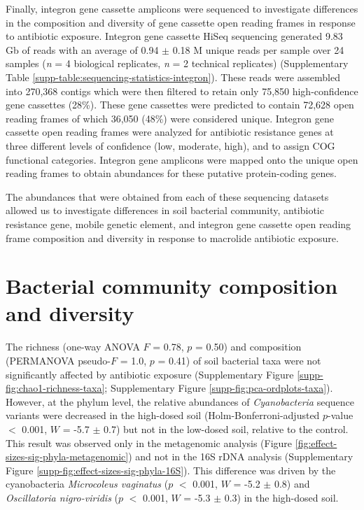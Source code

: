 Finally, integron gene cassette amplicons were sequenced to investigate differences in the composition and diversity of gene cassette open reading frames in response to antibiotic exposure.
Integron gene cassette HiSeq sequencing generated 9.83 Gb of reads with an average of 0.94 $\pm$ 0.18 M unique reads per sample over 24 samples (\textit{n} = 4 biological replicates, \textit{n} = 2 technical replicates) (Supplementary Table \ref{supp-table:sequencing-statistics-integron}).
These reads were assembled into 270,368 contigs which were then filtered to retain only 75,850 high-confidence gene cassettes (28\%).
These gene cassettes were predicted to contain 72,628 open reading frames of which 36,050 (48\%) were considered unique.
Integron gene cassette open reading frames were analyzed for antibiotic resistance genes at three different levels of confidence (low, moderate, high), and to assign COG functional categories.
Integron gene amplicons were mapped onto the unique open reading frames to obtain abundances for these putative protein-coding genes.

The abundances that were obtained from each of these sequencing datasets allowed us to investigate differences in soil bacterial community, antibiotic resistance gene, mobile genetic element, and integron gene cassette open reading frame composition and diversity in response to macrolide antibiotic exposure.

\section{Bacterial community composition and diversity}

The richness (one-way ANOVA $F$ = 0.78, $p$ = 0.50) and composition (PERMANOVA pseudo-$F$ = 1.0, $p$ = 0.41) of soil bacterial taxa were not significantly affected by antibiotic exposure (Supplementary Figure \ref{supp-fig:chao1-richness-taxa}; Supplementary Figure \ref{supp-fig:pca-ordplots-taxa}).
However, at the phylum level, the relative abundances of \textit{Cyanobacteria} sequence variants were decreased in the high-dosed soil (Holm-Bonferroni-adjusted $p$-value $<$ 0.001, $W$ = -5.7 $\pm$ 0.7) but not in the low-dosed soil, relative to the control.
This result was observed only in the metagenomic analysis (Figure \ref{fig:effect-sizes-sig-phyla-metagenomic}) and not in the 16S rDNA analysis (Supplementary Figure \ref{supp-fig:effect-sizes-sig-phyla-16S}).
This difference was driven by the cyanobacteria \textit{Microcoleus vaginatus} ($p$ $<$ 0.001, $W$ = -5.2 $\pm$ 0.8) and \textit{Oscillatoria nigro-viridis} ($p$ $<$ 0.001, $W$ = -5.3 $\pm$ 0.3) in the high-dosed soil.

